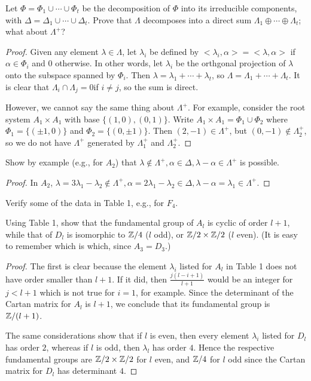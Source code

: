\begin{ex}
  Let $\Phi = \Phi_1 \cup \cdots \cup \Phi_t$ be the decomposition of $\Phi$ into its irreducible components, with $\Delta = \Delta_1 \cup \cdots \cup \Delta_t$. Prove that $\Lambda$ decomposes into a direct sum $\Lambda_1 \oplus \cdots \oplus \Lambda_t$; what about $\Lambda^{+}$?
\end{ex}
\begin{proof}
  Given any element $\lambda \in \Lambda$, let $\lambda_i$ be defined by $<\lambda_i,\alpha> = <\lambda, \alpha>$ if $\alpha \in\Phi_i$ and $0$ otherwise. In other words, let $\lambda_i$ be the orthgonal projection of $\lambda$ onto the subspace spanned by $\Phi_i$. Then $\lambda = \lambda_1 + \cdots + \lambda_t$, so $\Lambda = \Lambda_1 + \cdots + \Lambda_t$. It is clear that $\Lambda_i \cap \Lambda_j = 0 $if $i \neq j$, so the sum is direct.
  
  However, we cannot say the same thing about $\Lambda^{+}$. For example, consider the root system $A_1\times A_1$ with base $\{(1, 0), (0, 1)\}$. Write $A_1 \times A_1 = \Phi_1 \cup \Phi_2$ where $\Phi_1 = \{(\pm1, 0)\}$ and $\Phi_2 = \{(0,\pm1)\}$. Then $(2,-1) \in \Lambda^{+}$, but $(0,-1) \notin \Lambda^{+}_2$, so we do not have $\Lambda^{+}$ generated by $\Lambda^{+}_1$ and $\Lambda^{+}_2$.
\end{proof}

\begin{ex}
  Show by example (e.g., for $A_2$) that $\lambda\notin\Lambda^{+}, \alpha\in\Delta, \lambda-\alpha\in\Lambda^{+}$  is possible.
\end{ex}
\begin{proof}
  In $A_2$, $\lambda=3\lambda_1-\lambda_2\notin\Lambda^{+}, \alpha=2\lambda_1-\lambda_2\in\Delta, \lambda-\alpha=\lambda_1\in\Lambda^{+}$.
\end{proof}

\begin{ex}
  Verify some of the data in Table 1, e.g., for $F_4$.
\end{ex}

\begin{ex}
  Using Table 1, show that the fundamental group of $A_l$ is cyclic of order $l + 1$, while that of $D_l$ is isomorphic to ${\mathbb Z}/4$ ($l$ odd), or ${\mathbb Z}/2\times {\mathbb Z}/2$ ($l$ even). (It is easy to remember which is which, since $A_3 = D_3$.)
\end{ex}
\begin{proof}
  The first is clear because the element $\lambda_i$ listed for $A_l$ in Table 1 does not have order smaller than $l+ 1$. If it did, then $\frac{j(l-i+1)}{l+1}$ would be an integer for $j < l+ 1$ which is not true for $i = 1$, for example. Since the determinant of the Cartan matrix for $A_l$ is $l+ 1$, we conclude that its fundamental group is ${\mathbb Z}/(l+ 1)$.
  
  The same considerations show that if $l$ is even, then every element $\lambda_i$ listed for $D_l$ has order $2$, whereas if $l$ is odd, then $\lambda_l$ has order $4$. Hence the respective fundamental groups are ${\mathbb Z}/2\times {\mathbb Z}/2$ for $l$ even, and ${\mathbb Z}/4$ for $l$ odd since the Cartan matrix for $D_l$ has determinant $4$.
\end{proof}

